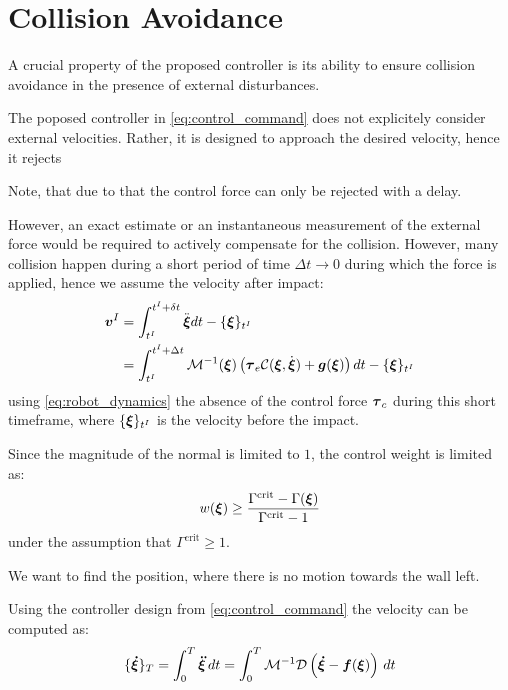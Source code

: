 \section{Collision Avoidance} \label{sec:collision_avoidance}

A crucial property of the proposed controller is its ability to ensure collision avoidance in the presence of external disturbances.

The poposed controller in \eqref{eq:control_command} does not explicitely consider external velocities. Rather, it is designed to approach the desired velocity, hence it rejects 

Note, that due to that the control force can only be rejected with a delay.

However, an exact estimate or an instantaneous measurement of the external force would be required to actively compensate for the collision.
However, many collision happen during a short period of time $\Delta t \rightarrow 0$ during which the force is applied, hence we assume the velocity after impact:
\begin{align}
	\boldsymbol{v}^I 
	 & = \int_{t^I}^{t^I + \delta t} \ddot{\boldsymbol{\xi}} dt - \{ \boldsymbol{\xi} \}_{t^I} \\
	 & = \int_{t^I}^{t^I + \Delta t} \mathcal{M}^{-1}(\boldsymbol{\xi})  \left( \boldsymbol{\tau}_e \mathcal{C}(\boldsymbol{\xi}, \dot{\boldsymbol{\xi}}) + \boldsymbol{g}(\boldsymbol{\xi}) \right) dt - \{\boldsymbol{\xi} \}_{t^I} \nonumber
\end{align}
using \eqref{eq:robot_dynamics} the absence of the control force $\boldsymbol{\tau}_c$ during this short timeframe, where $\{\boldsymbol{\xi} \}_{t^I}$ is the velocity before the impact.
 
Since the magnitude of the normal is limited to $1$, the control weight is limited as: 
\begin{equation}
w(\boldsymbol{\xi}) \geq \frac{\Gamma^{\mathrm{crit}} - \Gamma(\boldsymbol{\xi})}{\Gamma^{\mathrm{crit}} - 1}
\end{equation}
under the assumption that $\Gamma^{\mathrm{crit}} \geq 1$.

We want to find the position, where there is no motion towards the wall left.

Using the controller design from \eqref{eq:control_command} the velocity can be computed as:
\begin{equation}
\begin{split}
	\{ \vecs{\dot \xi} \}_{T} 
	& = \int_0^T\vecs{\ddot \xi} \, dt 
    = \int_0^T \matd{M}^{-1} \matd{D}  \left( \vecs{\dot \xi} - \vecs f(\vecs \xi) \right) \, dt \\
\end{split}
\label{eq:velocity_evolution}
\end{equation}

